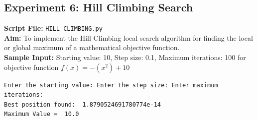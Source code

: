 \subsection*{Experiment 6: Hill Climbing Search}
\textbf{Script File:} \texttt{HILL_CLIMBING.py} \\[4pt]
\textbf{Aim:} To implement the Hill Climbing local search algorithm for finding the local or global maximum of a mathematical objective function. \\[4pt]
\textbf{Sample Input:} Starting value: 10, Step size: 0.1, Maximum iterations: 100 for objective function $f(x) = -(x^2) + 10$ \\[6pt]
\begin{tcolorbox}[colback=black!5!white,colframe=black!75!white,title=Terminal Execution Output - Hill Climbing Search]
\begin{verbatim}
Enter the starting value: Enter the step size: Enter maximum iterations: 
Best position found:  1.8790524691780774e-14
Maximum Value =  10.0
\end{verbatim}
\end{tcolorbox}

